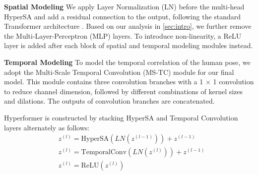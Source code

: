 \documentclass[10pt,twocolumn,letterpaper]{article}
\begin{document}

\noindent \textbf{Spatial Modeling}
We apply Layer Normalization (LN) before the multi-head HyperSA and add a residual connection to the output, following the standard Transformer architecture \cite{vaswani2017attention}.
Based on our analysis in \cref{sec:intro}, we further remove the Multi-Layer-Perceptron (MLP) layers. To introduce non-linearity, a ReLU layer is added after each block of spatial and temporal modeling modules instead.


\noindent \textbf{Temporal Modeling}
To model the temporal correlation of
the human pose, we adopt the Multi-Scale Temporal Convolution (MS-TC) module \cite{chen2021channel, liu2020disentangling, chi2022infogcn} for our final model. This module contains three convolution branches with a 1 × 1 convolution to reduce channel dimension, followed by different combinations of kernel sizes
and dilations. The outputs of convolution branches are
concatenated.



Hyperformer is constructed by stacking HyperSA and Temporal Convolution layers alternately as follows:
\begin{align}
    & z^{(l)} = \text{HyperSA}(LN(z^{(l-1)})) + z^{(l-1)} \\
    & z^{(l)} = \text{TemporalConv}(LN(z^{(l)})) + z^{(l-1)} \\
    & z^{(l)} = \text{ReLU}(z^{(l)})
\end{align}
\end{document}
